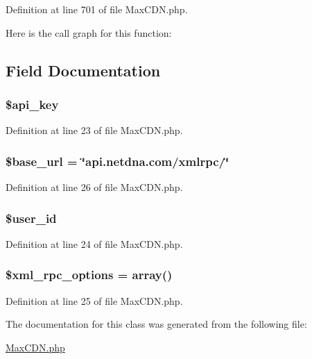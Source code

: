 Definition at line 701 of file MaxCDN.php.



Here is the call graph for this function:




\subsection{Field Documentation}
\hypertarget{class_max_c_d_n_a186dfe06d14a3bc248c4eb4bcdaec562}{
\subsubsection[{\$api\_\-key}]{\setlength{\rightskip}{0pt plus 5cm}\$api\_\-key}}
\label{class_max_c_d_n_a186dfe06d14a3bc248c4eb4bcdaec562}


Definition at line 23 of file MaxCDN.php.

\hypertarget{class_max_c_d_n_a6886427c9c643f707fcb35c018049bc7}{
\subsubsection[{\$base\_\-url}]{\setlength{\rightskip}{0pt plus 5cm}\$base\_\-url = \char`\"{}api.netdna.com/xmlrpc/\char`\"{}}}
\label{class_max_c_d_n_a6886427c9c643f707fcb35c018049bc7}


Definition at line 26 of file MaxCDN.php.

\hypertarget{class_max_c_d_n_af0fcd925f00973e32f7214859dfb3c6b}{
\subsubsection[{\$user\_\-id}]{\setlength{\rightskip}{0pt plus 5cm}\$user\_\-id}}
\label{class_max_c_d_n_af0fcd925f00973e32f7214859dfb3c6b}


Definition at line 24 of file MaxCDN.php.

\hypertarget{class_max_c_d_n_aa9300810e8d9adff7d3fdc176c218363}{
\subsubsection[{\$xml\_\-rpc\_\-options}]{\setlength{\rightskip}{0pt plus 5cm}\$xml\_\-rpc\_\-options = array()}}
\label{class_max_c_d_n_aa9300810e8d9adff7d3fdc176c218363}


Definition at line 25 of file MaxCDN.php.



The documentation for this class was generated from the following file:\begin{DoxyCompactItemize}
\item 
\hyperlink{_max_c_d_n_8php}{MaxCDN.php}\end{DoxyCompactItemize}

